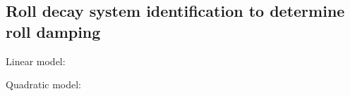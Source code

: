 \subsection{Roll decay system identification to determine roll damping}
Linear model:

Quadratic model:
 